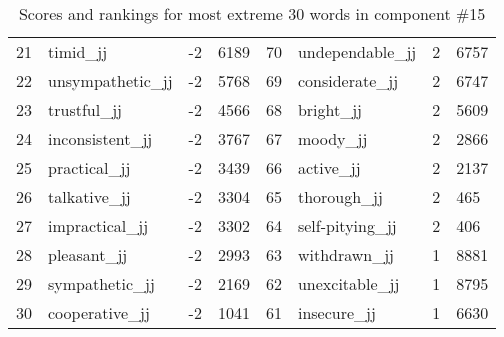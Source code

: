 \begin{table}[tbp]
\begin{tabular}{| rlr@{.}l | rlr@{.}l |}
    21 & timid\_jj & -2 & 6189    &    70 & undependable\_jj & 2 & 6757 \\
    22 & unsympathetic\_jj & -2 & 5768    &    69 & considerate\_jj & 2 & 6747 \\
    23 & trustful\_jj & -2 & 4566    &    68 & bright\_jj & 2 & 5609 \\
    24 & inconsistent\_jj & -2 & 3767    &    67 & moody\_jj & 2 & 2866 \\
    25 & practical\_jj & -2 & 3439    &    66 & active\_jj & 2 & 2137 \\
    26 & talkative\_jj & -2 & 3304    &    65 & thorough\_jj & 2 & 465 \\
    27 & impractical\_jj & -2 & 3302    &    64 & self-pitying\_jj & 2 & 406 \\
    28 & pleasant\_jj & -2 & 2993    &    63 & withdrawn\_jj & 1 & 8881 \\
    29 & sympathetic\_jj & -2 & 2169    &    62 & unexcitable\_jj & 1 & 8795 \\
    30 & cooperative\_jj & -2 & 1041    &    61 & insecure\_jj & 1 & 6630 \\
    \hline
    \end{tabular}
    \caption{Scores and rankings for most extreme 30 words in component \#15} 
\end{table}
\clearpage
